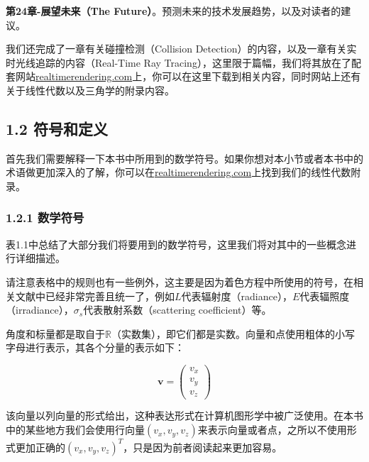 \documentclass[
  paper=a4,
  ,captions=tableheading
]{scrartcl}
\begin{document}
\textbf{第24章-展望未来（The
Future）}。预测未来的技术发展趋势，以及对读者的建议。

我们还完成了一章有关碰撞检测（Collision
Detection）的内容，以及一章有关实时光线追踪的内容（Real-Time Ray
Tracing），这里限于篇幅，我们将其放在了配套网站\href{http://realtimerendering.com}{realtimerendering.com}上，你可以在这里下载到相关内容，同时网站上还有关于线性代数以及三角学的附录内容。

\subsection{1.2 符号和定义}\label{ux7b26ux53f7ux548cux5b9aux4e49}

首先我们需要解释一下本书中所用到的数学符号。如果你想对本小节或者本书中的术语做更加深入的了解，你可以在\href{http://realtimerendering.com}{realtimerendering.com}上找到我们的线性代数附录。

\subsubsection{1.2.1 数学符号}\label{ux6570ux5b66ux7b26ux53f7}

表1.1中总结了大部分我们将要用到的数学符号，这里我们将对其中的一些概念进行详细描述。

请注意表格中的规则也有一些例外，这主要是因为着色方程中所使用的符号，在相关文献中已经非常完善且统一了，例如\(L\)代表辐射度（radiance），\(E\)代表辐照度（irradiance），\(\sigma_s\)代表散射系数（scattering
coefficient）等。

角度和标量都是取自于\(\mathbb{R}\)（实数集），即它们都是实数。向量和点使用粗体的小写字母进行表示，其各个分量的表示如下：

\[
\mathbf{v} = \left(  \begin{array}{c} v_x \\ v_y \\ v_z \end{array} \right)
\]

该向量以列向量的形式给出，这种表达形式在计算机图形学中被广泛使用。在本书中的某些地方我们会使用行向量\((v_x, v_y, v_z)\)来表示向量或者点，之所以不使用形式更加正确的\((v_x, v_y, v_z)^T\)，只是因为前者阅读起来更加容易。
\end{document}
